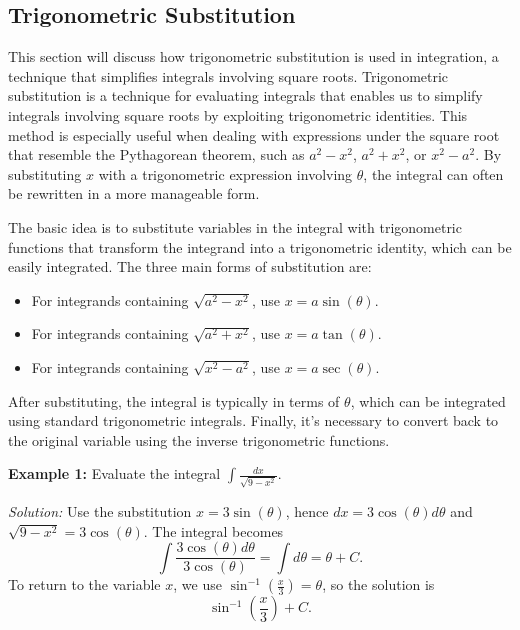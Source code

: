 \documentclass[a4paper,12pt]{book}
\begin{document}


\subsection{Trigonometric Substitution}
\label{subsec:trig_substitution}
This section will discuss how trigonometric substitution is used in integration, a technique that simplifies integrals involving square roots.
Trigonometric substitution is a technique for evaluating integrals that enables us to simplify integrals involving square roots by exploiting trigonometric identities. This method is especially useful when dealing with expressions under the square root that resemble the Pythagorean theorem, such as \( a^2 - x^2 \), \( a^2 + x^2 \), or \( x^2 - a^2 \). By substituting \( x \) with a trigonometric expression involving \( \theta \), the integral can often be rewritten in a more manageable form.

The basic idea is to substitute variables in the integral with trigonometric functions that transform the integrand into a trigonometric identity, which can be easily integrated. The three main forms of substitution are:
\begin{itemize}
    \item For integrands containing \( \sqrt{a^2 - x^2} \), use \( x = a \sin(\theta) \).
    \item For integrands containing \( \sqrt{a^2 + x^2} \), use \( x = a \tan(\theta) \).
    \item For integrands containing \( \sqrt{x^2 - a^2} \), use \( x = a \sec(\theta) \).
\end{itemize}

After substituting, the integral is typically in terms of \( \theta \), which can be integrated using standard trigonometric integrals. Finally, it's necessary to convert back to the original variable using the inverse trigonometric functions.

\textbf{Example 1:}
Evaluate the integral \( \int \frac{dx}{\sqrt{9 - x^2}} \).

\textit{Solution:} Use the substitution \( x = 3\sin(\theta) \), hence \( dx = 3\cos(\theta)d\theta \) and \( \sqrt{9 - x^2} = 3\cos(\theta) \). The integral becomes
\[ \int \frac{3\cos(\theta)d\theta}{3\cos(\theta)} = \int d\theta = \theta + C. \]
To return to the variable \( x \), we use \( \sin^{-1}(\frac{x}{3}) = \theta \), so the solution is
\[ \sin^{-1}\left(\frac{x}{3}\right) + C. \]
\end{document}
